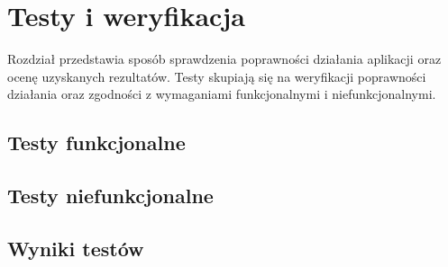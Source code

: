\chapter{Testy i weryfikacja}
Rozdział przedstawia sposób sprawdzenia poprawności działania aplikacji oraz ocenę uzyskanych rezultatów. Testy skupiają się na weryfikacji poprawności działania oraz zgodności z wymaganiami funkcjonalnymi i niefunkcjonalnymi.

\section{Testy funkcjonalne}

\section{Testy niefunkcjonalne}

\section{Wyniki testów}
